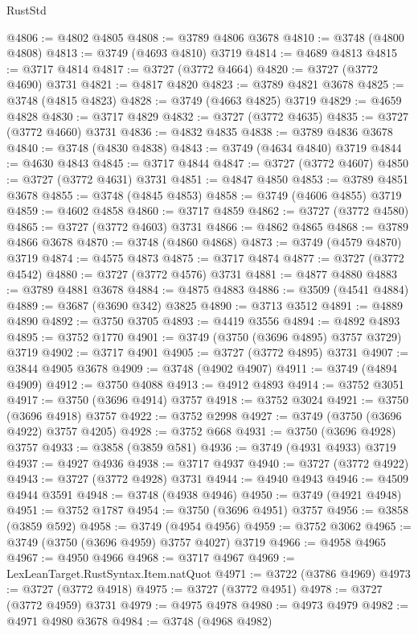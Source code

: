 \begin{lexlean}{RustStd}
\begin{coremodule}
@4806 := @4802 @4805
@4808 := @3789 @4806 @3678
@4810 := @3748 (@4800 @4808)
@4813 := @3749 (@4693 @4810) @3719
@4814 := @4689 @4813
@4815 := @3717 @4814
@4817 := @3727 (@3772 @4664)
@4820 := @3727 (@3772 @4690) @3731
@4821 := @4817 @4820
@4823 := @3789 @4821 @3678
@4825 := @3748 (@4815 @4823)
@4828 := @3749 (@4663 @4825) @3719
@4829 := @4659 @4828
@4830 := @3717 @4829
@4832 := @3727 (@3772 @4635)
@4835 := @3727 (@3772 @4660) @3731
@4836 := @4832 @4835
@4838 := @3789 @4836 @3678
@4840 := @3748 (@4830 @4838)
@4843 := @3749 (@4634 @4840) @3719
@4844 := @4630 @4843
@4845 := @3717 @4844
@4847 := @3727 (@3772 @4607)
@4850 := @3727 (@3772 @4631) @3731
@4851 := @4847 @4850
@4853 := @3789 @4851 @3678
@4855 := @3748 (@4845 @4853)
@4858 := @3749 (@4606 @4855) @3719
@4859 := @4602 @4858
@4860 := @3717 @4859
@4862 := @3727 (@3772 @4580)
@4865 := @3727 (@3772 @4603) @3731
@4866 := @4862 @4865
@4868 := @3789 @4866 @3678
@4870 := @3748 (@4860 @4868)
@4873 := @3749 (@4579 @4870) @3719
@4874 := @4575 @4873
@4875 := @3717 @4874
@4877 := @3727 (@3772 @4542)
@4880 := @3727 (@3772 @4576) @3731
@4881 := @4877 @4880
@4883 := @3789 @4881 @3678
@4884 := @4875 @4883
@4886 := @3509 (@4541 @4884)
@4889 := @3687 (@3690 @342) @3825
@4890 := @3713 @3512
@4891 := @4889 @4890
@4892 := @3750 @3705
@4893 := @4419 @3556
@4894 := @4892 @4893
@4895 := @3752 @1770
@4901 := @3749 (@3750 (@3696 @4895) @3757 @3729) @3719
@4902 := @3717 @4901
@4905 := @3727 (@3772 @4895) @3731
@4907 := @3844 @4905 @3678
@4909 := @3748 (@4902 @4907)
@4911 := @3749 (@4894 @4909)
@4912 := @3750 @4088
@4913 := @4912 @4893
@4914 := @3752 @3051
@4917 := @3750 (@3696 @4914) @3757
@4918 := @3752 @3024
@4921 := @3750 (@3696 @4918) @3757
@4922 := @3752 @2998
@4927 := @3749 (@3750 (@3696 @4922) @3757 @4205)
@4928 := @3752 @668
@4931 := @3750 (@3696 @4928) @3757
@4933 := @3858 (@3859 @581)
@4936 := @3749 (@4931 @4933) @3719
@4937 := @4927 @4936
@4938 := @3717 @4937
@4940 := @3727 (@3772 @4922)
@4943 := @3727 (@3772 @4928) @3731
@4944 := @4940 @4943
@4946 := @4509 @4944 @3591
@4948 := @3748 (@4938 @4946)
@4950 := @3749 (@4921 @4948)
@4951 := @3752 @1787
@4954 := @3750 (@3696 @4951) @3757
@4956 := @3858 (@3859 @592)
@4958 := @3749 (@4954 @4956)
@4959 := @3752 @3062
@4965 := @3749 (@3750 (@3696 @4959) @3757 @4027) @3719
@4966 := @4958 @4965
@4967 := @4950 @4966
@4968 := @3717 @4967
@4969 := LexLeanTarget.RustSyntax.Item.natQuot
@4971 := @3722 (@3786 @4969)
@4973 := @3727 (@3772 @4918)
@4975 := @3727 (@3772 @4951)
@4978 := @3727 (@3772 @4959) @3731
@4979 := @4975 @4978
@4980 := @4973 @4979
@4982 := @4971 @4980 @3678
@4984 := @3748 (@4968 @4982)

\end{coremodule}
\end{lexlean}
